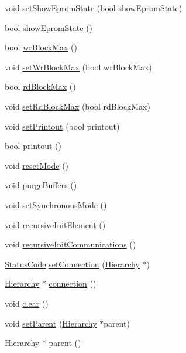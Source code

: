 \begin{DoxyCompactItemize}
\item 
void \hyperlink{classUsbFTMLInterface_a051a6eb8e7fe43c9c97d61f8aafeea8e}{setShowEpromState} (bool showEpromState)
\item 
bool \hyperlink{classUsbFTMLInterface_aa62fc0edc39360eeb473fe9e91df9044}{showEpromState} ()
\item 
bool \hyperlink{classUsbFTMLInterface_a296da37a9d4c2d78338800ebc283bb80}{wrBlockMax} ()
\item 
void \hyperlink{classUsbFTMLInterface_ab9ff3b850ed592872bd82c579052114f}{setWrBlockMax} (bool wrBlockMax)
\item 
bool \hyperlink{classUsbFTMLInterface_ac0a393da12305baa111deb699f7190cb}{rdBlockMax} ()
\item 
void \hyperlink{classUsbFTMLInterface_abdd0b79fb1d8a17c6a97969a291b858b}{setRdBlockMax} (bool rdBlockMax)
\item 
void \hyperlink{classUsbFTMLInterface_a807c9a67253303a7bc1b14558b9819ac}{setPrintout} (bool printout)
\item 
bool \hyperlink{classUsbFTMLInterface_a1045e3851406cf07e31c498d0de230e1}{printout} ()
\item 
void \hyperlink{classUsbFTMLInterface_a91063d4374b617177c6b7a4022385dd1}{resetMode} ()
\item 
void \hyperlink{classUsbFTMLInterface_ad5c6964b2618149f33c258f896e9f113}{purgeBuffers} ()
\item 
void \hyperlink{classUsbFTMLInterface_a8aa032fbbaf9d0adbeea2d147d7c8a14}{setSynchronousMode} ()
\item 
void \hyperlink{classElement_a3c0abcb36f8906688bb7e32608df7086}{recursiveInitElement} ()
\item 
void \hyperlink{classElement_a82119ed37dff76508a2746a853ec35ba}{recursiveInitCommunications} ()
\item 
\hyperlink{classStatusCode}{StatusCode} \hyperlink{classElement_ab476b4b1df5954141ceb14f072433b89}{setConnection} (\hyperlink{classHierarchy}{Hierarchy} $\ast$)
\item 
\hyperlink{classHierarchy}{Hierarchy} $\ast$ \hyperlink{classElement_af57444353c1ddf9fa0109801e97debf7}{connection} ()
\item 
void \hyperlink{classHierarchy_af4d43b0765b402670eed2d62c73405af}{clear} ()
\item 
void \hyperlink{classHierarchy_a585ad1aeec16077a0e532ab8b4fc557b}{setParent} (\hyperlink{classHierarchy}{Hierarchy} $\ast$parent)
\item 
\hyperlink{classHierarchy}{Hierarchy} $\ast$ \hyperlink{classHierarchy_a1c7bec8257e717f9c1465e06ebf845fc}{parent} ()

\end{DoxyCompactItemize}
